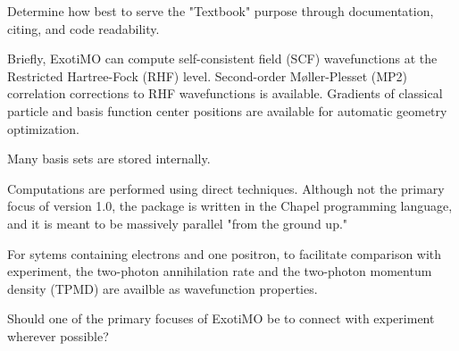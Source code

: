 \begin{TODO}
Determine how best to serve the "Textbook" purpose through documentation, citing, and code readability.
\end{TODO}

Briefly, ExotiMO can compute self-consistent field (SCF) wavefunctions at the Restricted Hartree-Fock (RHF)
level. Second-order M\o ller-Plesset (MP2) correlation corrections to RHF wavefunctions is available. 
Gradients of classical particle and basis function center positions are available for automatic geometry optimization.  

Many basis sets are stored internally.

Computations are performed using direct techniques. Although not the primary focus of version 1.0, 
the package is written in the Chapel programming language, and it is meant to be massively parallel 
"from the ground up." 

For sytems containing electrons and one positron, to facilitate comparison with experiment, the 
two-photon annihilation rate and the 
two-photon momentum density (TPMD) are availble as wavefunction properties.

\begin{openissue}
Should one of the primary focuses of ExotiMO be to connect with experiment wherever possible?
\end{openissue}

